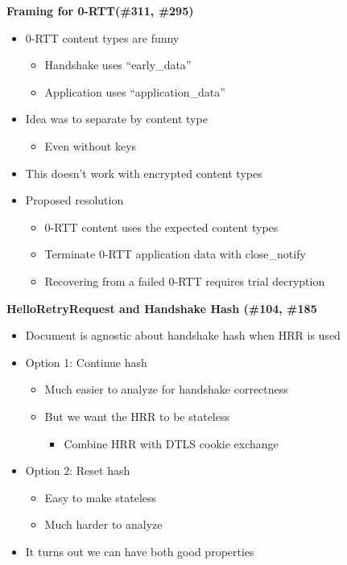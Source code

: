 \documentclass[helvetica]{seminar}
\newcommand{\heading}[1]{%
  \begin{center} 
    \large\bf 
    #1 
  \end{center} 
  \vspace{.4 in}}
\begin{document}
\begin{slide}
  \heading{Framing for 0-RTT(\#311, \#295)}

  \begin{itemize}
  \item 0-RTT content types are funny
    \begin{itemize}
    \item Handshake uses ``early\_data''
    \item Application uses ``application\_data''
    \end{itemize}
  \item Idea was to separate by content type
    \begin{itemize}
    \item Even without keys
    \end{itemize}

  \item This doesn't work with encrypted content types
  \item Proposed resolution
    \begin{itemize}
    \item 0-RTT content uses the expected content types
    \item Terminate 0-RTT application data with close\_notify
    \item Recovering from a failed 0-RTT requires trial decryption
    \end{itemize}
  \end{itemize}
\end{slide}

\begin{slide}
  \heading{HelloRetryRequest and Handshake Hash (\#104, \#185}

  \begin{itemize}
  \item Document is agnostic about handshake hash when HRR is used
  \item Option 1: Continue hash
    \begin{itemize}
    \item Much easier to analyze for handshake correctness
    \item But we want the HRR to be stateless
      \begin{itemize}
      \item Combine HRR with DTLS cookie exchange
      \end{itemize}
    \end{itemize}

  \item Option 2: Reset hash
    \begin{itemize}
    \item Easy to make stateless
    \item Much harder to analyze
    \end{itemize}

  \item It turns out we can have both good properties
  \end{itemize}
\end{slide}
\end{document}
